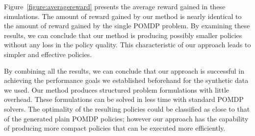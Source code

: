 Figure~\ref{figure:averagereward} presents the average reward gained in these simulations. The amount of
reward gained by our method is nearly identical to the amount of reward gained by the single POMDP problem.
By examining these results, we can conclude that our method is producing possibly smaller policies without
any loss in the policy quality. This characteristic of our approach leads to simpler and effective policies.

By combining all the results, we can conclude that our approach is successful in achieving the performance
goals we established beforehand for the synthetic data we used. Our method produces structured problem
formulations with little overhead. These formulations can be solved in less time with standard POMDP solvers.
The optimality of the resulting policies could be classified as close to that of the generated plain POMDP
policies; however our approach has the capability of producing more compact policies that can be executed
more efficiently.

